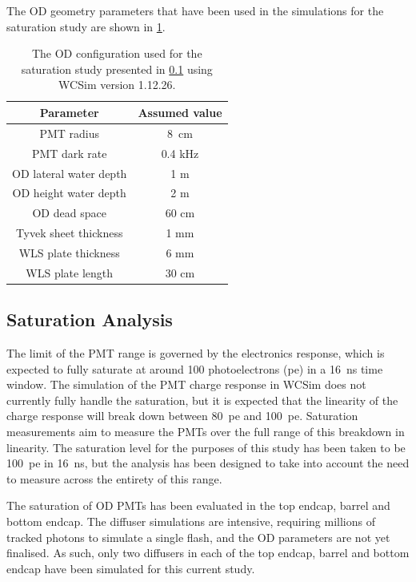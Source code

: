 \documentclass[a4paper,11pt]{article}
\begin{document}
The OD geometry parameters that have been used in the simulations for the saturation study are shown in \cref{tab:od_config}.

\begin{table}[ht!]
    \centering
    \begin{tabular}{|c|c|}
    \hline
        Parameter    & Assumed value \\
        \hline
       PMT radius  &  8~cm\\
       PMT dark rate & 0.4 kHz \\
       OD lateral water depth  & 1 m \\
       OD height water depth & 2 m\\
       OD dead space & 60 cm \\
       Tyvek sheet thickness & 1 mm\\
       WLS plate thickness & 6 mm \\
       WLS plate length & 30 cm \\
       \hline
    \end{tabular}
    \caption{The OD configuration used for the saturation study presented in \cref{subsec:satStudy} using WCSim version 1.12.26.}
    \label{tab:od_config}
\end{table}



\subsection{Saturation Analysis}\label{subsec:satStudy}

The limit of the PMT range is governed by the electronics response, which is expected to fully saturate at around 100 photoelectrons (pe) in a 16~ns time window. The simulation of the PMT charge response in WCSim does not currently fully handle the saturation, but it is expected that the linearity of the charge response will break down between 80~pe and 100~pe. Saturation measurements aim to measure the PMTs over the full range of this breakdown in linearity. The saturation level for the purposes of this study has been taken to be 100~pe in 16~ns, but the analysis has been designed to take into account the need to measure across the entirety of this range.

The saturation of OD PMTs has been evaluated in the top endcap, barrel and bottom endcap. The diffuser simulations are intensive, requiring millions of tracked photons to simulate a single flash, and the OD parameters are not yet finalised. As such, only two diffusers in each of the top endcap, barrel and bottom endcap have been simulated for this current study.
\end{document}
